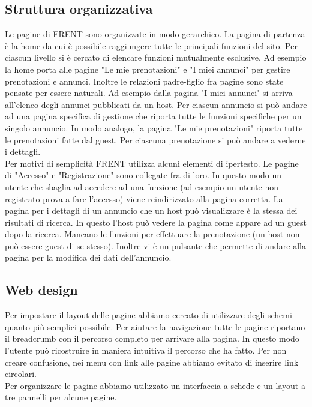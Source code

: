 \documentclass[1_relazione.tex]{subfiles}
\begin{document}
\subsection{Struttura organizzativa}
Le pagine di FRENT sono organizzate in modo gerarchico. La pagina di partenza \`{e} la home da cui \`{e} possibile raggiungere tutte le principali funzioni del sito. Per ciascun livello si \`{e} cercato di elencare funzioni mutualmente esclusive. Ad esempio la home porta alle pagine "Le mie prenotazioni" e "I miei annunci" per gestire prenotazioni e annunci. Inoltre le relazioni padre-figlio fra pagine sono state pensate per essere naturali. Ad esempio dalla pagina "I miei annunci" si arriva all'elenco degli annunci pubblicati da un host. Per ciascun annuncio si pu\`{o} andare ad una pagina specifica di gestione che riporta tutte le funzioni specifiche per un singolo annuncio. In modo analogo, la pagina "Le mie prenotazioni" riporta tutte le prenotazioni fatte dal guest. Per ciascuna prenotazione si pu\`{o} andare a vederne i dettagli. \\
Per motivi di semplicit\`{a} FRENT utilizza alcuni elementi di ipertesto. Le pagine di "Accesso" e "Registrazione" sono collegate fra di loro. In questo modo un utente che sbaglia ad accedere ad una funzione (ad esempio un utente non registrato prova a fare l'accesso) viene reindirizzato alla pagina corretta.
La pagina per i dettagli di un annuncio che un host pu\`{o} visualizzare \`{e} la stessa dei risultati di ricerca. In questo l'host pu\`{o} vedere la pagina come appare ad un guest dopo la ricerca. Mancano le funzioni per effettuare la prenotazione (un host non pu\`{o} essere guest di se stesso). Inoltre vi \`{e} un pulsante che permette di andare alla pagina per la modifica dei dati dell'annuncio.

\subsection{Web design}
Per impostare il layout delle pagine abbiamo cercato di utilizzare degli schemi quanto pi\`{u} semplici possibile. Per aiutare la navigazione tutte le pagine riportano il breadcrumb con il percorso completo per arrivare alla pagina. In questo modo l'utente pu\`{o} ricostruire in maniera intuitiva il percorso che ha fatto. Per non creare confusione, nei menu con link alle pagine abbiamo evitato di inserire link circolari. \\
Per organizzare le pagine abbiamo utilizzato un interfaccia a schede e un layout a tre pannelli per alcune pagine.
\end{document}
